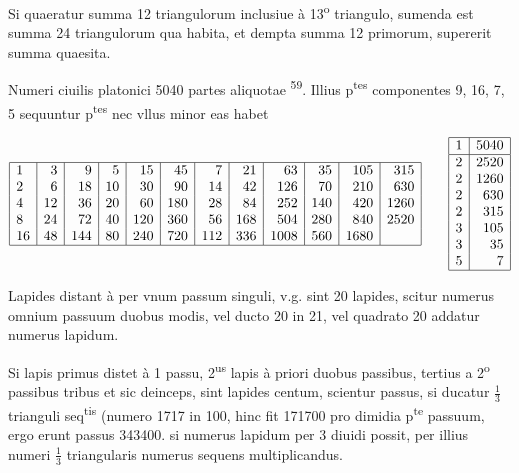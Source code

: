 \documentclass[11pt,a4paper]{article}
\begin{document}
Si quaeratur summa 12 triangulorum inclusiue à 13\textsuperscript{o} triangulo, sumenda est summa 24 triangulorum qua habita, et dempta summa 12 primorum, supererit summa quaesita.

Numeri ciuilis platonici 5040 partes aliquotae  \textsuperscript{59}. Illius p\textsuperscript{tes} componentes 9, 16, 7, 5 sequuntur p\textsuperscript{tes} nec vllus minor eas habet

\[
\begin{array}{|l|r|r|r|r|r|r|r|r|r|r|r|}
\hline
1 & 3 & 9 & 5 & 15 & 45 & 7 & 21 & 63 & 35 & 105 & 315 \\
2 & 6 & 18 & 10 & 30 & 90 & 14 & 42 & 126 & 70 & 210 & 630 \\
4 & 12 & 36 & 20 & 60 & 180 & 28 & 84 & 252 & 140 & 420 & 1260 \\
8 & 24 & 72 & 40 & 120 & 360 & 56 & 168 & 504 & 280 & 840 & 2520 \\
16 & 48 & 144 & 80 & 240 & 720 & 112 & 336 & 1008 & 560 & 1680 & \\
\hline
\end{array}
\qquad
\begin{array}{|c|r|}
\hline
1 & 5040 \\
\hline
2 & 2520 \\
2 & 1260 \\
2 & 630 \\
2 & 315 \\
3 & 105 \\
3 & 35 \\
5 & 7 \\
\hline
\end{array}
\]

Lapides distant à \ill{} per vnum passum singuli, v.g. sint 20 lapides, scitur numerus omnium passuum duobus modis, vel ducto 20 in 21, vel quadrato 20 addatur numerus lapidum.

Si lapis primus distet à \ill{} 1 passu, 2\textsuperscript{us} lapis à priori duobus passibus, tertius a 2\textsuperscript{o} passibus tribus et sic deinceps, sint lapides centum, scientur passus, si ducatur $\frac{1}{3}$ trianguli seq\textsuperscript{tis} (numero 1717 in 100, hinc fit 171700 pro dimidia p\textsuperscript{te} passuum, ergo erunt passus 343400. si numerus lapidum per 3 diuidi possit, per illius numeri $\frac{1}{3}$ triangularis numerus sequens multiplicandus.
\end{document}
